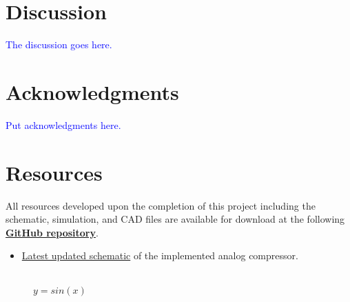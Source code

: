 \documentclass[10pt]{article}
\begin{document}
\begin{multicols*}{2}
        \section{Discussion}
            \textcolor{blue}{The discussion goes here.}

        \section*{Acknowledgments}
            \textcolor{blue}{Put acknowledgments here. }

        \section*{Resources}
            All resources developed upon the completion of this project including the schematic, simulation, and CAD files are available for download at the following \textbf{\textcolor{github-butterfly-bush}{\href{https://github.com/ShaunG-RU/DRC-Project}{GitHub repository}}}.
            
            \begin{itemize}
                \item \href{https://github.com/ShaunG-RU/DRC-Project/blob/main/Altium/DRC.pdf}{Latest updated schematic} of the implemented analog compressor.
            \end{itemize}

        \printbibliography

        \iffalse
        \begin{figure*}[!th]

            \centering

            \begin{minipage}[b]{0.2\linewidth}
                \centering
                \\
                \footnotesize{$y=sin(x)$}
            \end{minipage}\hfill


\end{figure*}
\end{multicols*}
\end{document}
